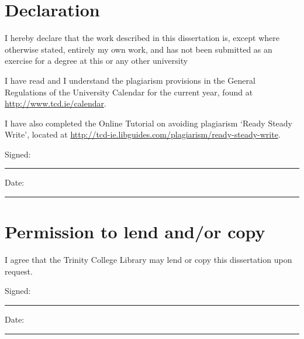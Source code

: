 \documentclass[a4paper,oneside,12pt]{book}
\title{\thesistitle}
\author{\authorname}
\begin{document}



\setlength\paperheight{297mm}
\setlength\paperwidth{210mm}

\setlength{\textheight}{235mm} %
\setlength{\oddsidemargin}{10mm}  %
\setlength{\evensidemargin}{10mm} %
\setlength{\textwidth}{155mm}



\section*{\Huge{Declaration}}
\vspace{1cm}
I hereby declare that the work described in this dissertation is, except where otherwise stated, entirely my own work, and has not been submitted as an exercise for a degree at this or any other university

\vspace{1cm}
I have read and I understand the plagiarism provisions in the General Regulations of the University Calendar for the current year, found at \url{http://www.tcd.ie/calendar}.
\vspace{1cm}

I have also completed the Online Tutorial on avoiding plagiarism `Ready Steady Write', located at
\url{http://tcd-ie.libguides.com/plagiarism/ready-steady-write}.
\vspace{3cm}

Signed:~\rule{5cm}{0.3pt}\hfill Date:~\rule{5cm}{0.3pt}
\newpage

\section*{\Huge{Permission to lend and/or copy}}
\vspace{1cm}
I agree that the Trinity College Library may lend or copy this dissertation upon request.

\vspace{3cm}

Signed:~\rule{5cm}{0.3pt}\hfill Date:~\rule{5cm}{0.3pt}


\newpage


\onehalfspacing\raggedright %
\end{document}
